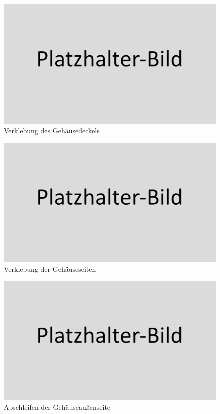 \begin{figure}[h!tb]
	\includegraphics[width=1\textwidth]{img/placeholder.png}
	\caption[Verklebung des Gehäusedeckels]{Verklebung des Gehäusedeckels}
	\label{fig:glued_parts_01}
\end{figure}
\begin{figure}[h!tb]
	\includegraphics[width=1\textwidth]{img/placeholder.png}
	\caption[Verklebung der Gehäuseseiten]{Verklebung der Gehäuseseiten}
	\label{fig:glued_parts_02}
\end{figure}
\begin{figure}[h!tb]
	\includegraphics[width=1\textwidth]{img/placeholder.png}
	\caption[Abschleifen der Gehäuseaußenseite]{Abschleifen der Gehäuseaußenseite}
	\label{fig:filed_parts}
\end{figure}
